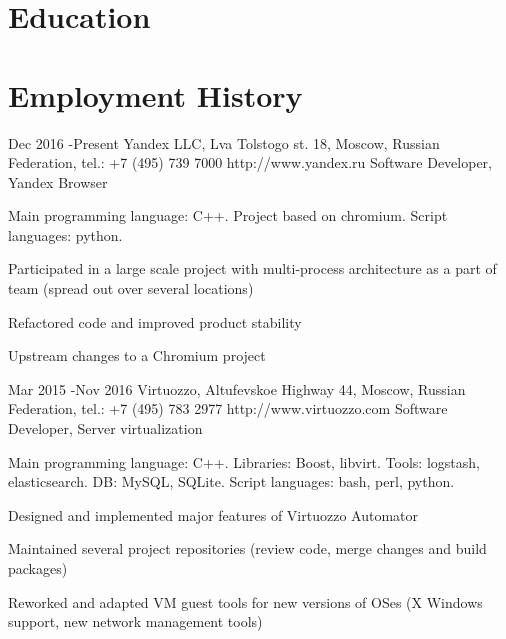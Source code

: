 \documentclass[10pt]{article} %
\begin{document}
\section{Education}



\section{Employment History}

\job
{Dec 2016 -}{Present}
{Yandex LLC, Lva Tolstogo st. 18, Moscow, Russian Federation, tel.: +7 (495) 739 7000}
{http://www.yandex.ru}
{Software Developer, Yandex Browser}
{
Main programming language: C++. Project based on chromium. Script languages: python.
\begin{itemize-noindent}
\setlength\itemsep{0em}
\item{Participated in a large scale project with multi-process architecture as a part of team (spread out over several locations)}
\item{Refactored code and improved product stability}
\item{Upstream changes to a Chromium project}
\end{itemize-noindent}
}


\job
{Mar 2015 -}{Nov 2016}
{Virtuozzo, Altufevskoe Highway 44, Moscow, Russian Federation, tel.: +7 (495) 783 2977}
{http://www.virtuozzo.com}
{Software Developer, Server virtualization}
{
Main programming language: C++. Libraries: Boost, libvirt. Tools: logstash, elasticsearch. DB: MySQL, SQLite. Script languages: bash, perl, python.
\begin{itemize-noindent}
\setlength\itemsep{0em}
\item{Designed and implemented major features of Virtuozzo Automator}
\item{Maintained several project repositories (review code, merge changes and build packages)}
\item{Reworked and adapted VM guest tools for new versions of OSes (X Windows support, new network management tools)}
\end{itemize-noindent}
}
\end{document}
